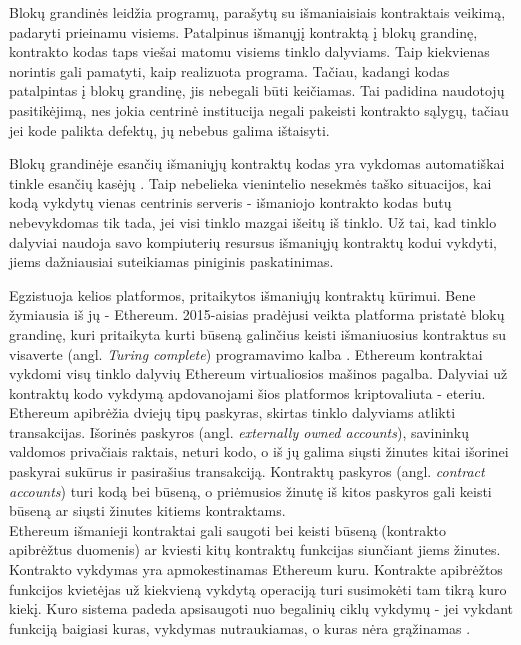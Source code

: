 Blokų grandinės leidžia programų, parašytų su išmaniaisiais kontraktais veikimą,
padaryti prieinamu visiems. Patalpinus išmanųjį kontraktą į blokų grandinę, kontrakto kodas taps viešai matomu
visiems tinklo dalyviams. Taip kiekvienas norintis gali pamatyti, kaip realizuota programa.
Tačiau, kadangi kodas patalpintas į blokų grandinę, jis nebegali būti keičiamas. Tai padidina naudotojų pasitikėjimą, nes jokia centrinė institucija negali
pakeisti kontrakto sąlygų, tačiau jei kode palikta defektų, jų nebebus galima ištaisyti.

Blokų grandinėje esančių išmaniųjų kontraktų kodas yra vykdomas automatiškai tinkle esančių kasėjų \cite{Zheng2017}.
Taip nebelieka vienintelio nesekmės taško situacijos, kai kodą vykdytų vienas centrinis serveris - išmaniojo kontrakto
kodas butų nebevykdomas tik tada, jei visi tinklo mazgai išeitų iš tinklo. Už tai, kad tinklo dalyviai naudoja savo kompiuterių
resursus išmaniųjų kontraktų kodui vykdyti, jiems dažniausiai suteikiamas piniginis paskatinimas.

Egzistuoja kelios platformos, pritaikytos išmaniųjų kontraktų kūrimui. Bene žymiausia iš jų - Ethereum.
2015-aisias pradėjusi veikta platforma pristatė blokų grandinę, kuri pritaikyta kurti būseną galinčius keisti
išmaniuosius kontraktus su visaverte
(angl. \textit{Turing complete}) programavimo kalba \cite{EthereumWhitePaper}. Ethereum kontraktai vykdomi visų tinklo
dalyvių Ethereum virtualiosios mašinos pagalba. Dalyviai už kontraktų kodo vykdymą apdovanojami šios platformos kriptovaliuta - eteriu.\\
Ethereum apibrėžia dviejų tipų paskyras, skirtas tinklo dalyviams atlikti transakcijas. Išorinės paskyros
(angl. \textit{externally owned accounts}), savininkų valdomos privačiais raktais, neturi kodo, o iš jų galima
siųsti žinutes kitai išorinei paskyrai sukūrus ir pasirašius transakciją. Kontraktų paskyros (angl. \textit{contract accounts})
turi kodą bei būseną, o priėmusios žinutę iš kitos paskyros gali keisti būseną ar siųsti žinutes kitiems kontraktams.\\
Ethereum išmanieji kontraktai gali saugoti bei keisti būseną (kontrakto apibrėžtus duomenis) ar kviesti kitų kontraktų funkcijas siunčiant jiems žinutes.
Kontrakto vykdymas yra apmokestinamas Ethereum kuru. Kontrakte apibrėžtos funkcijos kvietėjas už kiekvieną
vykdytą operaciją turi susimokėti tam tikrą kuro kiekį. Kuro sistema padeda apsisaugoti nuo begalinių ciklų vykdymų - jei vykdant
funkciją baigiasi kuras, vykdymas nutraukiamas, o kuras nėra grąžinamas \cite{EthereumWhitePaper}.\\

